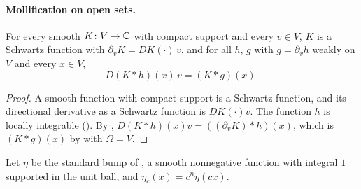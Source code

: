 \paragraph{Mollification on open sets.}

\begin{lemma}
\label{lem:mollification-weak-derivative}
\leanok
{}
For every smooth $K \colon V \to \mathbb{C}$ with compact support and every $v \in V$, $K$ is a Schwartz
function with $\partial_v K = DK(\cdot) \, v$, and for all $h$, $g$ with $g = \partial_v h$
weakly on $V$ and every $x \in V$,
\[
  D(K * h)(x) \, v = (K * g)(x) .
\]
\end{lemma}

\begin{proof}
\leanok
A smooth function with compact support is a Schwartz function, and its directional derivative
as a Schwartz function is $DK(\cdot) v$. The function $h$ is locally integrable
(). By ,
$D(K * h)(x) v = ((\partial_v K) * h)(x)$, which is $(K * g)(x)$ by
 with $\Omega = V$.
\end{proof}

Let $\eta$ be the standard bump of , a smooth nonnegative
function with integral $1$ supported in the unit ball, and $\eta_c(x) = c^n \eta(c x)$.

